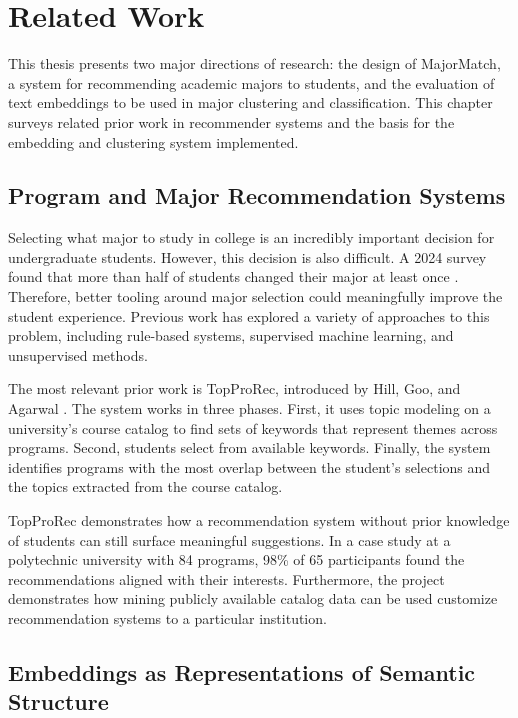 
\chapter{Related Work}

This thesis presents two major directions of research: the design of MajorMatch, a system for recommending academic majors to students, and the evaluation of text embeddings to be used in major clustering and classification. This chapter surveys related prior work in recommender systems and the basis for the embedding and clustering system implemented.

\section{Program and Major Recommendation Systems}

Selecting what major to study in college is an incredibly important decision for undergraduate students. However, this decision is also difficult. A 2024 survey found that more than half of students changed their major at least once \cite{BERTopic}. Therefore, better tooling around major selection could meaningfully improve the student experience. Previous work has explored a variety of approaches to this problem, including rule-based systems, supervised machine learning, and unsupervised methods.

The most relevant prior work is TopProRec, introduced by Hill, Goo, and Agarwal \cite{BERTopic}. The system works in three phases. First, it uses topic modeling on a university's course catalog to find sets of keywords that represent themes across programs. Second, students select from available keywords. Finally, the system identifies programs with the most overlap between the student's selections and the topics extracted from the course catalog.

TopProRec demonstrates how a recommendation system without prior knowledge of students can still surface meaningful suggestions. In a case study at a polytechnic university with 84 programs, 98\% of 65 participants found the recommendations aligned with their interests. Furthermore, the project demonstrates how mining publicly available catalog data can be used customize recommendation systems to a particular institution.

\section{Embeddings as Representations of Semantic Structure}

